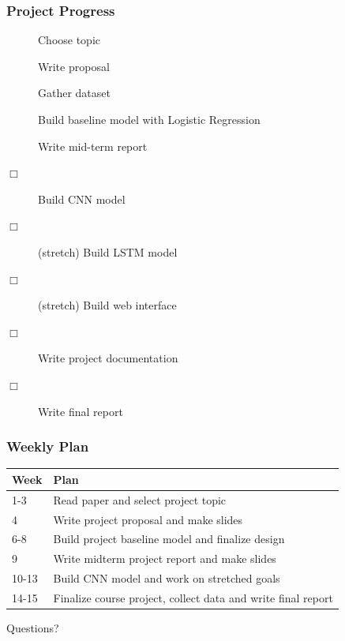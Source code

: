 \documentclass{beamer}
\begin{document}
\begin{frame}
\frametitle{Project Progress}
    \begin{description}
        \item[\CheckedBox] Choose topic
        \item[\CheckedBox] Write proposal
        \item[\CheckedBox] Gather dataset
        \item[\CheckedBox] Build baseline model with Logistic Regression
        \item[\CheckedBox] Write mid-term report 
        \item[$\Box$] Build CNN model
        \item[$\Box$] (stretch) Build LSTM model
        \item[$\Box$] (stretch) Build web interface
        \item[$\Box$] Write project documentation
        \item[$\Box$] Write final report
    \end{description}
\end{frame}

\begin{frame}
\frametitle{Weekly Plan}
\begin{center}
    \begin{tabular}{| l | p{7cm} |}
        \hline
        Week & Plan \\ \hline
        1-3 & Read paper and select project topic \\ \hline
        4 & Write project proposal and make slides \\ \hline
        6-8 & Build project baseline model and finalize design \\ \hline
        9 & Write midterm project report and make slides \\ \hline
        10-13 & Build CNN model and work on stretched goals \\ \hline
        14-15 & Finalize course project, collect data and write final report \\ \hline
        \end{tabular}
    \end{center}
\end{frame}

\begin{frame}
\center Questions?
\end{frame}
\end{document}
